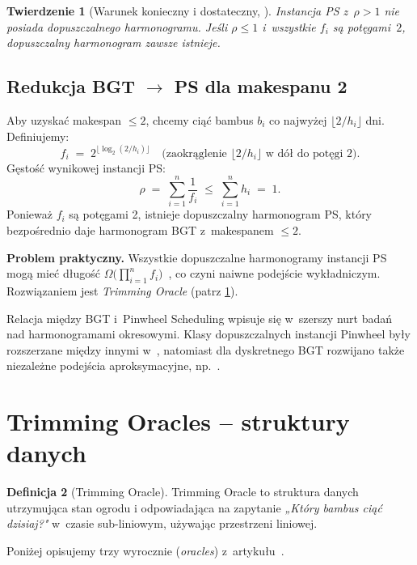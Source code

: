 \documentclass[12pt,a4paper]{article}
\theoremstyle{plain}
\newtheorem{twierdzenie}{Twierdzenie}[section]
\theoremstyle{definition}
\newtheorem{definicja}[twierdzenie]{Definicja}
\theoremstyle{remark}
\begin{document}
\begin{twierdzenie}[Warunek konieczny i dostateczny, \cite{holte1989}]
Instancja PS z~$\rho > 1$ nie posiada dopuszczalnego harmonogramu.
Jeśli $\rho \leq 1$ i~wszystkie $f_i$ są potęgami~$2$, dopuszczalny
harmonogram zawsze istnieje.
\end{twierdzenie}

\subsection{Redukcja BGT $\to$ PS dla makespanu 2}

Aby uzyskać makespan $\leq 2$, chcemy ciąć bambus $b_i$ co najwyżej
$\lfloor 2/h_i \rfloor$ dni. Definiujemy:
\[
  f_i \;=\; 2^{\lfloor \log_2(2/h_i) \rfloor}
  \quad\text{(zaokrąglenie $\lfloor 2/h_i \rfloor$ w~dół do potęgi 2)}.
\]
Gęstość wynikowej instancji PS:
\[
  \rho \;=\; \sum_{i=1}^{n} \frac{1}{f_i}
       \;\leq\; \sum_{i=1}^{n} h_i
       \;=\; 1.
\]
Ponieważ $f_i$ są potęgami 2, istnieje dopuszczalny harmonogram PS,
który bezpośrednio daje harmonogram BGT z~makespanem $\leq 2$.

\textbf{Problem praktyczny.} Wszystkie dopuszczalne harmonogramy instancji PS
mogą mieć długość $\Omega\!\bigl(\prod_{i=1}^{n} f_i\bigr)$~\cite{holte1989},
co czyni naiwne podejście wykładniczym. Rozwiązaniem jest \emph{Trimming Oracle}
(patrz \cref{sec:oracles}).

Relacja między BGT i~Pinwheel Scheduling wpisuje się w~szerszy nurt badań
nad harmonogramami okresowymi. Klasy dopuszczalnych instancji Pinwheel były
rozszerzane między innymi w~\cite{chan1993}, natomiast dla dyskretnego BGT
rozwijano także niezależne podejścia aproksymacyjne, np.~\cite{vee2020}.

\section{Trimming Oracles – struktury danych}\label{sec:oracles}

\begin{definicja}[Trimming Oracle]
Trimming Oracle to struktura danych utrzymująca stan ogrodu i odpowiadająca
na zapytanie \emph{„Który bambus ciąć dzisiaj?"} w~czasie sub-liniowym,
używając przestrzeni liniowej.
\end{definicja}

Poniżej opisujemy trzy wyrocznie (\emph{oracles}) z~artykułu~\cite{bilo2022}.
\end{document}
